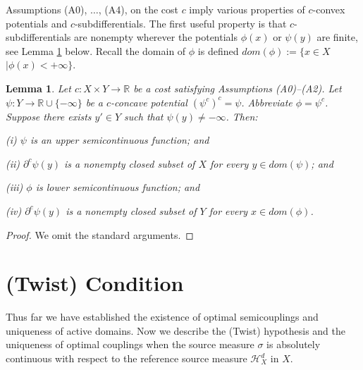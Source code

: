 \documentclass[12pt]{amsart}
\newtheorem{lem}{Lemma}
\theoremstyle{definition}
\theoremstyle{remark}
\newcommand{\bR}{\mathbb{R}}
\newcommand{\del}{\partial}
\begin{document}
Assumptions (A0), $\ldots$, (A4), on the cost $c$ imply various properties of $c$-convex potentials and $c$-subdifferentials. The first useful property is that $c$-subdifferentials are nonempty wherever the potentials $\phi(x)$ or $\psi(y)$ are finite, see Lemma \ref{psilem1} below. Recall the domain of $\phi$ is defined $dom(\phi):=\{x\in X$ $| \phi(x) <+\infty\}$.

\begin{lem}\label{psilem1}
Let $c: X\times Y \to \bR$ be a cost satisfying Assumptions (A0)--(A2). Let $\psi: Y\to \bR \cup \{-\infty\}$ be a $c$-concave potential $(\psi^c)^c=\psi$. Abbreviate $\phi=\psi^c$. Suppose there exists $y' \in Y$ such that $\psi(y) \neq -\infty$. Then:

(i) $\psi$ is an upper semicontinuous function; and

(ii) $\del^c \psi(y)$ is a nonempty closed subset of $X$ for every $y\in dom(\psi)$; and 

(iii) $\phi$ is lower semicontinuous function; and 

(iv) $\del^c \psi(y)$ is a nonempty closed subset of $Y$ for every $x\in dom(\phi)$. 

\end{lem}
\begin{proof}
We omit the standard arguments.



\end{proof}






\section{(Twist) Condition}\label{uos}
Thus far we have established the existence of optimal semicouplings and uniqueness of active domains. Now we describe the (Twist) hypothesis and the uniqueness of optimal couplings when the source measure $\sigma$ is absolutely continuous with respect to the reference source measure $\mathscr{H}_X^d$ in $X$. 
\end{document}
